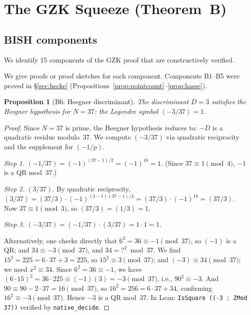 \documentclass[11pt]{article}
\theoremstyle{plain}
\newtheorem{proposition}[theorem]{Proposition}
\theoremstyle{definition}
\theoremstyle{remark}
\begin{document}
\section{The GZK Squeeze (Theorem~B)}
\label{sec:squeeze}

\subsection{BISH components}

We identify 15 components of the GZK proof that are constructively verified.

We give proofs or proof sketches for each component. Components B1--B5 were proved in \S\ref{sec:hecke} (Propositions~\ref{prop:pointcount}--\ref{prop:hasse}).

\begin{proposition}[B6: Heegner discriminant]\label{prop:heegner-disc}
The discriminant $D = 3$ satisfies the Heegner hypothesis for $N = 37$: the Legendre symbol $(-3/37) = 1$.
\end{proposition}

\begin{proof}
Since $N = 37$ is prime, the Heegner hypothesis reduces to: $-D$ is a quadratic residue modulo~$37$. We compute $(-3/37)$ via quadratic reciprocity and the supplement for $(-1/p)$.

\emph{Step 1.} $(-1/37) = (-1)^{(37-1)/2} = (-1)^{18} = 1$. (Since $37 \equiv 1 \pmod{4}$, $-1$ is a QR mod~$37$.)

\emph{Step 2.} $(3/37)$. By quadratic reciprocity, $(3/37) = (37/3) \cdot (-1)^{(3-1)(37-1)/4} = (37/3) \cdot (-1)^{18} = (37/3)$. Now $37 \equiv 1 \pmod{3}$, so $(37/3) = (1/3) = 1$.

\emph{Step 3.} $(-3/37) = (-1/37) \cdot (3/37) = 1 \cdot 1 = 1$.

Alternatively, one checks directly that $6^2 = 36 \equiv -1 \pmod{37}$, so $(-1)$ is a QR; and $34 \equiv -3 \pmod{37}$, and $34 = ?^2 \bmod 37$. We find $15^2 = 225 = 6 \cdot 37 + 3 = 225$, so $15^2 \equiv 3 \pmod{37}$; and $(-3) \equiv 34 \pmod{37}$; we need $x^2 \equiv 34$. Since $6^2 = 36 \equiv -1$, we have $(6 \cdot 15)^2 = 36 \cdot 225 \equiv (-1)(3) = -3 \pmod{37}$, i.e., $90^2 \equiv -3$. And $90 \equiv 90 - 2 \cdot 37 = 16 \pmod{37}$, so $16^2 = 256 = 6 \cdot 37 + 34$, confirming $16^2 \equiv -3 \pmod{37}$. Hence $-3$ is a QR mod~$37$. In Lean: \texttt{IsSquare ((-3 : ZMod 37))} verified by \texttt{native\_decide}.
\end{proof}
\end{document}
